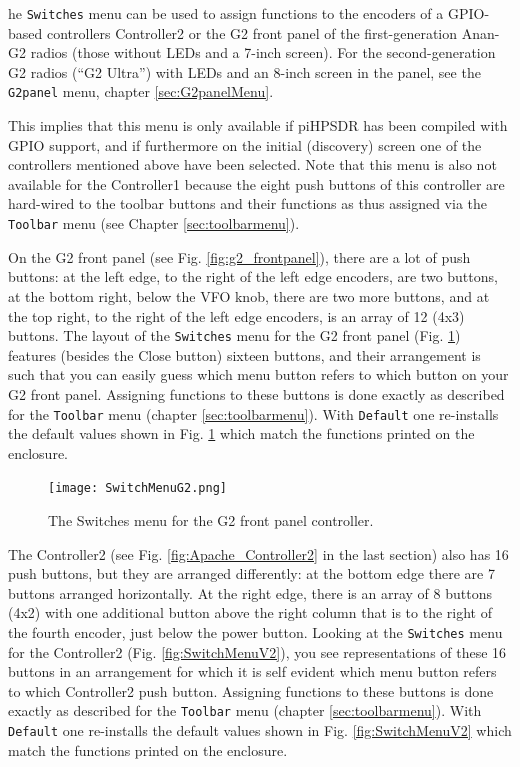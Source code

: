 \documentclass[12pt]{book}
\def\rett#1{\texttt{\color{red}#1}}
\def\bltt#1{\texttt{\color{blue}#1}}
\def\pH{pi\-HPSDR\xspace}
\begin{document}
he \bltt{Switches} menu can be used to assign functions to the encoders of a
GPIO-based controllers Controller2 or the G2 front panel of the first-generation Anan-G2 radios
(those without LEDs and a 7-inch screen). For the second-generation G2 radios
(``G2 Ultra'') with LEDs and an 8-inch screen in the panel, see the \bltt{G2panel}
menu, chapter \ref{sec:G2panelMenu}.

This implies that this menu is only available if \pH has been compiled with GPIO support,
and if furthermore on the initial (discovery) screen one of the controllers mentioned above have
been selected. Note that this menu is also not available
for the Controller1 because the eight push buttons of this controller are hard-wired to
the toolbar buttons and their functions as thus assigned via the \bltt{Toolbar} menu
(see Chapter \ref{sec:toolbarmenu}).


On the G2 front panel (see Fig. \ref{fig:g2_frontpanel}),
there are a lot of push buttons: at the left edge, to the right
of the left edge encoders, are two buttons, at the bottom right, below the VFO knob,
there are two more buttons, and at the top right, to the right of the left edge
encoders, is an array of 12 (4x3) buttons. The layout of the \bltt{Switches} menu
for the G2 front panel (Fig. \ref{fig:SwitchMenuG2}) features (besides the Close
button) sixteen buttons, and their arrangement is such that you can easily guess
which menu button refers to which button on your G2 front panel. Assigning functions
to these buttons is done exactly as described for the \bltt{Toolbar} menu
(chapter \ref{sec:toolbarmenu}). With \rett{Default} one re-installs the default values
shown in Fig. \ref{fig:SwitchMenuG2} which match the functions printed on the enclosure.

\begin{figure}[ht]
\center
\texttt{[image: SwitchMenuG2.png]}
\caption{The Switches menu for the G2 front panel controller.}
\label{fig:SwitchMenuG2}
\end{figure}

The Controller2 (see Fig. \ref{fig:Apache_Controller2} in the last section)
also has 16 push buttons, but they are arranged differently:
at the bottom edge there are 7 buttons arranged horizontally. At the right
edge, there is an array of 8 buttons (4x2) with one additional button
above the right column that is to the right of the fourth encoder, just
below the power button. Looking at the \bltt{Switches} menu for the
Controller2 (Fig. \ref{fig:SwitchMenuV2}), you see representations of
these 16 buttons in an arrangement for which it is self evident which
menu button refers to which Controller2 push button.
Assigning functions
to these buttons is done exactly as described for the \bltt{Toolbar} menu
(chapter \ref{sec:toolbarmenu}).
With \rett{Default} one re-installs the default values
shown in Fig. \ref{fig:SwitchMenuV2} which match the functions printed on the enclosure.
\end{document}
